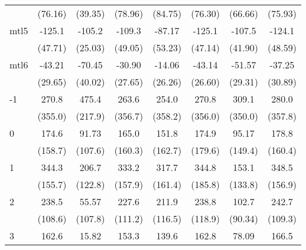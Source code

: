 \documentclass{article}
\begin{document}
{\begin{longtable}{l*{7}{c}}
                &  (76.16)         &  (39.35)         &  (78.96)         &  (84.75)         &  (76.30)         &  (66.66)         &  (75.93)         \\
mtl5            &   -125.1\sym{*}  &   -105.2\sym{***}&   -109.3\sym{*}  &   -87.17         &   -125.1\sym{*}  &   -107.5\sym{*}  &   -124.1\sym{*}  \\
                &  (47.71)         &  (25.03)         &  (49.05)         &  (53.23)         &  (47.14)         &  (41.90)         &  (48.59)         \\
mtl6            &   -43.21         &   -70.45         &   -30.90         &   -14.06         &   -43.14         &   -51.57         &   -37.25         \\
                &  (29.65)         &  (40.02)         &  (27.65)         &  (26.26)         &  (26.60)         &  (29.31)         &  (30.89)         \\
-1              &    270.8         &    475.4\sym{*}  &    263.6         &    254.0         &    270.8         &    309.1         &    280.0         \\
                &  (355.0)         &  (217.9)         &  (356.7)         &  (358.2)         &  (356.0)         &  (350.0)         &  (357.8)         \\
0               &    174.6         &    91.73         &    165.0         &    151.8         &    174.9         &    95.17         &    178.8         \\
                &  (158.7)         &  (107.6)         &  (160.3)         &  (162.7)         &  (179.6)         &  (149.4)         &  (160.4)         \\
1               &    344.3\sym{*}  &    206.7         &    333.2\sym{*}  &    317.7         &    344.8         &    153.1         &    348.5\sym{*}  \\
                &  (155.7)         &  (122.8)         &  (157.9)         &  (161.4)         &  (185.8)         &  (133.8)         &  (156.9)         \\
2               &    238.5\sym{*}  &    55.57         &    227.6         &    211.9         &    238.8         &    102.7         &    242.7\sym{*}  \\
                &  (108.6)         &  (107.8)         &  (111.2)         &  (116.5)         &  (118.9)         &  (90.34)         &  (109.3)         \\
3               &    162.6         &    15.82         &    153.3         &    139.6         &    162.8         &    78.09         &    166.5         \\

\end{longtable}}
\end{document}
